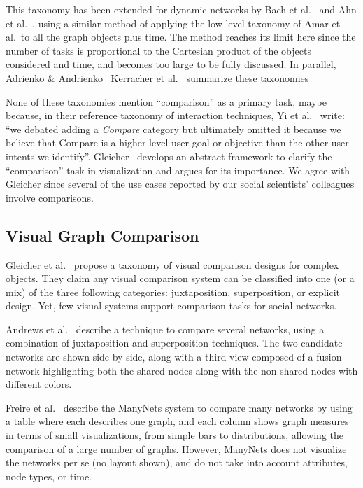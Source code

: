 This taxonomy has been extended for dynamic networks by Bach et al.~\cite{bach:hal-00906597} and Ahn et al.~\cite{Ahn14}, using a similar method of applying the low-level taxonomy of Amar et al.\ to all the graph objects plus time. The method reaches its limit here since the number of tasks is proportional to the Cartesian product of the objects considered and time, and becomes too large to be fully discussed.
In parallel, Adrienko \& Andrienko~\cite{andrienko2006exploratory}
Kerracher et al.~\cite{Kerracher15} summarize these taxonomies 

None of these taxonomies mention ``comparison'' as a primary task, maybe because, in their reference taxonomy of interaction techniques, Yi et al.~\cite{yiDeeperUnderstandingRole2007} write: ``we debated adding a \emph{Compare} category but ultimately
omitted it because we believe that Compare is a higher-level user goal or objective than the other user intents we identify''. Gleicher~\cite{Gleicher18, gleicherVisualComparisonInformation2011} develops an abstract framework to clarify the ``comparison'' task in visualization and argues for its importance.
We agree with Gleicher since several of the use cases reported by our social scientists' colleagues involve comparisons.
\fi

\subsection{Visual Graph Comparison}

Gleicher et al.~\cite{Gleicher18} propose a taxonomy of visual comparison designs for complex objects. They claim any visual comparison system can be classified into one (or a mix) of the three following categories: juxtaposition, superposition, or explicit design.
Yet, few visual systems support comparison tasks for social networks.

Andrews et al.~\cite{andrewsVisualGraphComparison2009} describe a technique to compare several networks, using a combination of juxtaposition and superposition techniques.
The two candidate networks are shown side by side, along with a third view composed of a fusion network highlighting both the shared nodes along with the non-shared nodes with different colors.

Freire et al.~\cite{ManyNets} describe the ManyNets system to compare many networks by using a table where each describes one graph, and each column shows graph measures in terms of small visualizations, from simple bars to distributions, allowing the comparison of a large number of graphs. However, ManyNets does not visualize the networks per se (no layout shown), and do not take into account attributes, node types, or time.

